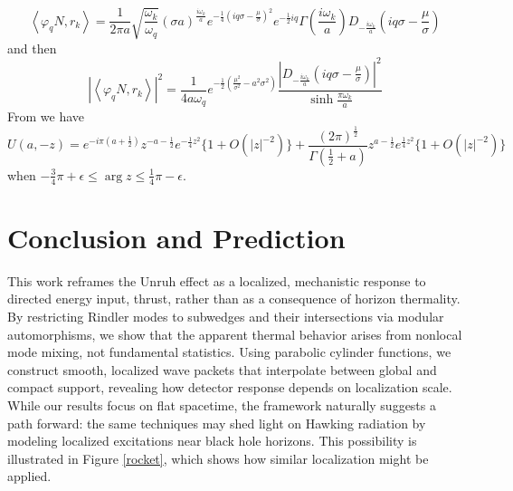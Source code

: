 \documentclass[12pt,a4paper]{article}
\begin{document}
\begin{equation}
  \left< \varphi_q N, r_k \right> = \frac{1}{2\pi a} \sqrt{\frac{\omega_k}{\omega_q}} (\sigma a)^\frac{i\omega_k}{a} e^{-\frac{1}{4}\left(i q \sigma - \frac{\mu}{\sigma}\right)^2} e^{-\frac{1}{2} i q} \Gamma\left(\frac{i \omega_k}{a}\right) D_{-\frac{i\omega_k}{a}}\left(iq\sigma - \frac{\mu}{\sigma}\right)
\end{equation}
and then
\begin{equation}
  \left|\left< \varphi_q N, r_k \right>\right|^2 = \frac{1}{4a\omega_q} e^{-\frac{1}{2} \left(\frac{\mu^2}{\sigma^2} - a^2 \sigma^2\right)} \frac{\left| D_{-\frac{i\omega_k}{a}}\left(iq\sigma - \frac{\mu}{\sigma}\right) \right|^2}{\sinh \frac{\pi \omega_k}{a}}
\end{equation}
From \cite{Olver1959UniformAE} we have
\begin{equation}
  U(a, -z) = e^{-i\pi(a + \frac{1}{2})}z^{-a - \frac{1}{2}}e^{-\frac{1}{4}z^2} \{ 1 + O(|z|^{-2}) \} + \frac{(2 \pi)^{\frac{1}{2}}}{\Gamma(\frac{1}{2} + a)} z^{a-\frac{1}{2}} e^{\frac{1}{4}z^2} \{1 + O(|z|^{-2})\}
\end{equation}
when $-\frac{3}{4}\pi + \epsilon \le \arg z \le \frac{1}{4} \pi - \epsilon$.

\section{Conclusion and Prediction}

This work reframes the Unruh effect as a localized, mechanistic response to directed energy input, thrust, rather than as a consequence of horizon thermality. By restricting Rindler modes to subwedges and their intersections via modular automorphisms, we show that the apparent thermal behavior arises from nonlocal mode mixing, not fundamental statistics. Using parabolic cylinder functions, we construct smooth, localized wave packets that interpolate between global and compact support, revealing how detector response depends on localization scale. While our results focus on flat spacetime, the framework naturally suggests a path forward: the same techniques may shed light on Hawking radiation by modeling localized excitations near black hole horizons. This possibility is illustrated in Figure \ref{rocket}, which shows how similar localization might be applied.
\end{document}
